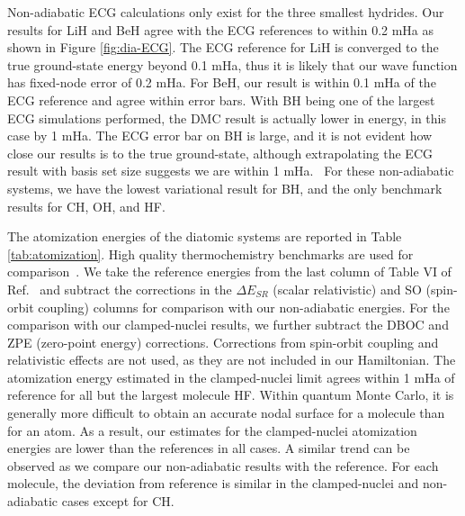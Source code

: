 \documentclass[pra,superscriptaddress,groupedaddress,twocolumn]{revtex4}
\begin{document}
Non-adiabatic ECG calculations only exist for the three smallest hydrides. Our results for LiH and BeH agree with the ECG references to within 0.2 mHa as shown in Figure \ref{fig:dia-ECG}. The ECG reference for LiH is converged to the true ground-state energy beyond 0.1 mHa, thus it is likely that our wave function has fixed-node error of 0.2 mHa. For BeH, our result is within 0.1 mHa of the ECG reference and agree within error bars. With BH being one of the largest ECG simulations performed, the DMC result is actually lower in energy, in this case by 1 mHa. The ECG error bar on BH is large, and it is not evident how close our results is to the true ground-state, although extrapolating the ECG result with basis set size suggests we are within 1 mHa.~\cite{Bubin_BeH_noBO} For these non-adiabatic systems, we have the lowest variational result for BH, and the only benchmark results for CH, OH, and HF.

The atomization energies of the diatomic systems are reported in Table \ref{tab:atomization}. High quality thermochemistry benchmarks are used for comparison~\cite{Feller_Corrections}. We take the reference energies from the last column of Table VI of Ref.~\cite{Feller_Corrections} and subtract the corrections in the $\Delta E_{SR}$ (scalar relativistic) and SO (spin-orbit coupling) columns for comparison with our non-adiabatic energies. For the comparison with our clamped-nuclei results, we further subtract the DBOC and ZPE (zero-point energy) corrections. Corrections from spin-orbit coupling and relativistic effects are not used, as they are not included in our Hamiltonian. The atomization energy estimated in the clamped-nuclei limit agrees within 1 mHa of reference for all but the largest molecule HF. %
Within quantum Monte Carlo, it is generally more difficult to obtain an accurate nodal surface for a molecule than for an atom. As a result, our estimates for the clamped-nuclei atomization energies are lower than the references in all cases. A similar trend can be observed as we compare our non-adiabatic results with the reference. For each molecule, the deviation from reference is similar in the clamped-nuclei and non-adiabatic cases except for CH.
\end{document}
